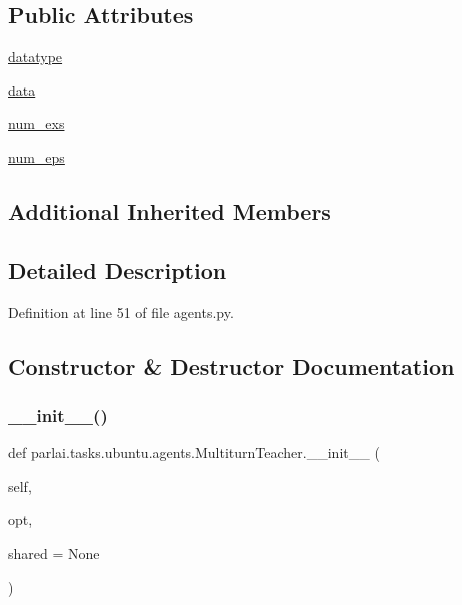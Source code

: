 \subsection*{Public Attributes}
\begin{DoxyCompactItemize}
\item 
\hyperlink{classparlai_1_1tasks_1_1ubuntu_1_1agents_1_1MultiturnTeacher_a6e07d1f855fea7080206ec095407065c}{datatype}
\item 
\hyperlink{classparlai_1_1tasks_1_1ubuntu_1_1agents_1_1MultiturnTeacher_a0746041b61b1174f04efa5e19c6ec55d}{data}
\item 
\hyperlink{classparlai_1_1tasks_1_1ubuntu_1_1agents_1_1MultiturnTeacher_a71904bff60bd65a5f4cad98df1f55a3b}{num\+\_\+exs}
\item 
\hyperlink{classparlai_1_1tasks_1_1ubuntu_1_1agents_1_1MultiturnTeacher_a6b629627b3d8a7e0a5c05e4265e50c35}{num\+\_\+eps}
\end{DoxyCompactItemize}
\subsection*{Additional Inherited Members}


\subsection{Detailed Description}


Definition at line 51 of file agents.\+py.



\subsection{Constructor \& Destructor Documentation}
\mbox{\label{classparlai_1_1tasks_1_1ubuntu_1_1agents_1_1MultiturnTeacher_acf41b09581b173c90820787ebe77116e}} 
\subsubsection{\texorpdfstring{\+\_\+\+\_\+init\+\_\+\+\_\+()}{\_\_init\_\_()}}
{\footnotesize\ttfamily def parlai.\+tasks.\+ubuntu.\+agents.\+Multiturn\+Teacher.\+\_\+\+\_\+init\+\_\+\+\_\+ (\begin{DoxyParamCaption}\item[{}]{self,  }\item[{}]{opt,  }\item[{}]{shared = {\ttfamily None} }\end{DoxyParamCaption})}



